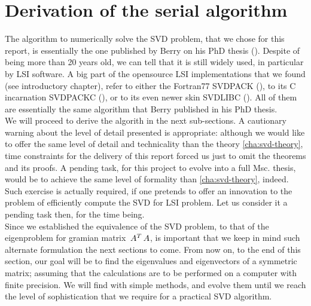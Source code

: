 \section{Derivation of the serial algorithm}

The algorithm to numerically solve the SVD problem, that we chose for
this report, is essentially the one published by Berry on his PhD
thesis (\cite{berry91}). Despite of being more than 20 years old, we can
tell that it is still widely used, in particular by LSI software. A
big part of the opensource LSI implementations that we found (see
introductory chapter), refer to either the Fortran77 SVDPACK
(\cite{svdpack}), to its C incarnation SVDPACKC (\cite{svdpackc}), or
to its even newer skin SVDLIBC (\cite{svdlibc}). All of them are
essentially the same algorithm that Berry published in his PhD
thesis. \\

We will proceed to derive the algorith in the next sub-sections. A
cautionary warning about the level of detail presented is appropriate:
although we would like to offer the same level of detail and
technicality than the theory \cref{cha:svd-theory}, time constraints
for the delivery of this report forced us just to omit the theorems
and its proofs. A pending task, for this project to evolve into a full
Msc. thesis, would be to achieve the same level of formality than
\cref{cha:svd-theory}, indeed. Such exercise is actually required, if
one pretends to offer an innovation to the problem of efficiently
compute the SVD for LSI problem. Let us consider it a pending task
then, for the time being. \\

Since we established the equivalence of the SVD problem, to that of the
eigenproblem for gramian matrix $\,{A}^{T}\,A$, is important that we
keep in mind such alternate formulation the next sections to come. From now
on, to the end of this section, our goal will be to find the
eigenvalues and eigenvectors of a symmetric matrix; assuming that the
calculations are to be performed on a computer with finite
precision. We will find with simple methods, and evolve them until we
reach the level of sophistication that we require for a practical SVD
algorithm. \\








